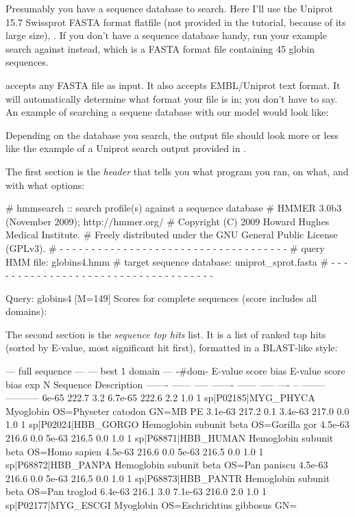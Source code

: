 Presumably you have a sequence database to search. Here I'll use the
Uniprot 15.7 Swissprot FASTA format flatfile (not provided in the
tutorial, because of its large size), .  If
you don't have a sequence database handy, run your example search
against  instead, which is a FASTA format
file containing 45 globin sequences.

 accepts any FASTA file as input. It also accepts
EMBL/Uniprot text format. It will automatically determine what format
your file is in; you don't have to say. An example of searching a
sequene database with our  model would look like:


Depending on the database you search, the output file
 should look more or less like the example of a
Uniprot search output provided in .

The first section is the \emph{header} that tells you what program you
ran, on what, and with what options:

\begin{sreoutput}
# hmmsearch :: search profile(s) against a sequence database
# HMMER 3.0b3 (November 2009); http://hmmer.org/
# Copyright (C) 2009 Howard Hughes Medical Institute.
# Freely distributed under the GNU General Public License (GPLv3).
# - - - - - - - - - - - - - - - - - - - - - - - - - - - - - - - - - - - -
# query HMM file:                  globins4.hmm
# target sequence database:        uniprot_sprot.fasta
# - - - - - - - - - - - - - - - - - - - - - - - - - - - - - - - - - - - -

Query:       globins4  [M=149]
Scores for complete sequences (score includes all domains):
\end{sreoutput}

The second section is the \emph{sequence top hits} list. It is a list
of ranked top hits (sorted by E-value, most significant hit first),
formatted in a BLAST-like style:

\begin{sreoutput}
   --- full sequence ---   --- best 1 domain ---    -#dom-
    E-value  score  bias    E-value  score  bias    exp  N  Sequence              Description
    ------- ------ -----    ------- ------ -----   ---- --  --------              -----------
      6e-65  222.7   3.2    6.7e-65  222.6   2.2    1.0  1  sp|P02185|MYG_PHYCA   Myoglobin OS=Physeter catodon GN=MB PE
    3.1e-63  217.2   0.1    3.4e-63  217.0   0.0    1.0  1  sp|P02024|HBB_GORGO   Hemoglobin subunit beta OS=Gorilla gor
    4.5e-63  216.6   0.0      5e-63  216.5   0.0    1.0  1  sp|P68871|HBB_HUMAN   Hemoglobin subunit beta OS=Homo sapien
    4.5e-63  216.6   0.0      5e-63  216.5   0.0    1.0  1  sp|P68872|HBB_PANPA   Hemoglobin subunit beta OS=Pan paniscu
    4.5e-63  216.6   0.0      5e-63  216.5   0.0    1.0  1  sp|P68873|HBB_PANTR   Hemoglobin subunit beta OS=Pan troglod
    6.4e-63  216.1   3.0    7.1e-63  216.0   2.0    1.0  1  sp|P02177|MYG_ESCGI   Myoglobin OS=Eschrichtius gibbosus GN=
 \end{sreoutput}

